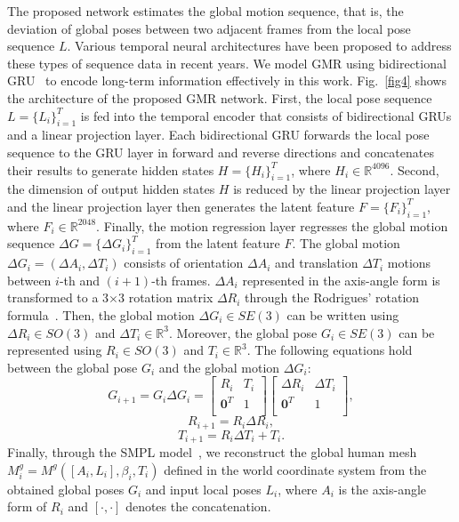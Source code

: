 \documentclass[10pt,twocolumn,letterpaper]{article}
\begin{document}
The proposed network estimates the global motion sequence, that is, the deviation of global poses between two adjacent frames from the local pose sequence $L$. Various temporal neural architectures have been proposed to address these types of sequence data in recent years. We model GMR using bidirectional GRU~\cite{cho-etal-2014-learning} to encode long-term information effectively in this work. Fig.~\ref{fig4} shows the architecture of the proposed GMR network. First, the local pose sequence $L=\{L_{i}\}^{T}_{i=1}$ is fed into the temporal encoder that consists of bidirectional GRUs and a linear projection layer. Each bidirectional GRU forwards the local pose sequence to the GRU layer in forward and reverse directions and concatenates their results to generate hidden states $H=\{H_{i}\}^{T}_{i=1}$, where $H_{i}\in{\mathbb{R}^{4096}}$. Second, the dimension of output hidden states $H$ is reduced by the linear projection layer and the linear projection layer then generates the latent feature $F=\{F_{i}\}^{T}_{i=1}$, where $F_{i}\in{\mathbb{R}^{2048}}$. Finally, the motion regression layer regresses the global motion sequence $\Delta{G}=\{\Delta{G}_{i}\}^{T}_{i=1}$ from the latent feature $F$. The global motion $\Delta{G_{i}}=(\Delta{A_{i}},\Delta{T_{i}})$ consists of orientation $\Delta{A_{i}}$ and translation $\Delta{T_{i}}$ motions between $i$-th and $(i+1)$-th frames. $\Delta{A_{i}}$ represented in the axis-angle form is transformed to a 3$\times$3 rotation matrix $\Delta{R_{i}}$ through the Rodrigues' rotation formula~\cite{gallego2015compact}. Then, the global motion $\Delta{G_{i}}\in{SE(3)}$ can be written using $\Delta{R_{i}}\in{SO(3)}$ and $\Delta{T_{i}}\in{\mathbb{R}^3}$. Moreover, the global pose $G_{i}\in{SE(3)}$ can be represented using $R_{i}\in{SO(3)}$ and $T_{i}\in{\mathbb{R}^3}$. The following equations hold between the global pose $G_{i}$ and the global motion $\Delta{G_{i}}$:
\begin{equation}
\label{eq: global pose calculation}
    {G_{i+1}}={G_{i}}{\Delta{G_{i}}}=
    \begin{bmatrix}
    R_{i} & T_{i} \\
    \mathbf{0}^{T} & 1 \\
    \end{bmatrix}
    \begin{bmatrix}
    \Delta{R_{i}} & \Delta{T_{i}} \\
    \mathbf{0}^{T} & 1 \\
    \end{bmatrix}
    ,
\end{equation}
\begin{equation}
\label{eq: orientation calculation}
    R_{i+1}=R_{i}\Delta{R_{i}},
\end{equation}
\begin{equation}
\label{eq: translation calculation}
    T_{i+1}=R_{i}\Delta{T_{i}}+T_{i}.
\end{equation}
Finally, through the SMPL model~\cite{loper2015smpl}, we reconstruct the global human mesh ${M}^{g}_{i}={M}^{g}([A_{i},L_{i}],\beta_{i},T_{i})$ defined in the world coordinate system from the obtained global poses $G_{i}$ and input local poses $L_{i}$, where $A_{i}$ is the axis-angle form of $R_{i}$ and $[\cdot,\cdot]$ denotes the concatenation.
\end{document}
